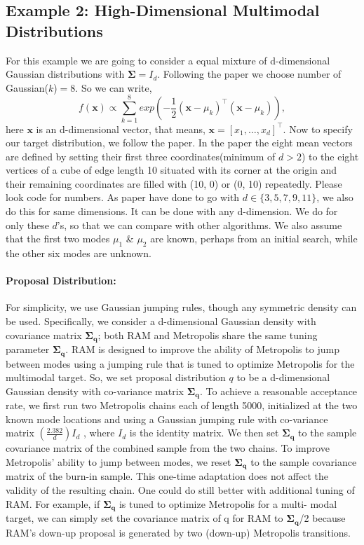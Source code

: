 \documentclass{article}
\begin{document}
\subsection{Example 2: High-Dimensional Multimodal
Distributions
}
For this example we are going to consider a equal mixture of  d-dimensional Gaussian distributions with $\mathbf{\Sigma}=I_d$. Following the paper we choose number of Gaussian($k$)$=8$. So we can write,
\begin{equation*}
    f(\mathbf{x}) \propto \sum_{k=1}^8 exp\left(-\frac{1}{2}(\mathbf{x}-\mu_k)^\top(\mathbf{x}-\mu_k)\right),
\end{equation*}
here $\mathbf{x}$ is an d-dimensional vector, that means, $\mathbf{x}=[x_1,\ldots,x_d]^\top$. Now to specify our target distribution, we follow the paper. In the paper the eight mean vectors are
defined by setting their first three coordinates(minimum of $d>2$) to the eight vertices of a cube of edge length 10 situated with its corner at the
origin and their remaining coordinates are filled with (10, 0) or
(0, 10) repeatedly. Please look code for numbers.
As paper have done to go with $d \in \{3,5,7,9,11\}$, we also do this for same dimensions. It can be done with any d-dimension. We do for only these $d$'s, so that we can compare with other algorithms. We also assume that the first two modes $\mu_1$ \& $\mu_2$ are known, perhaps
from an initial search, while the other six modes are unknown.
\paragraph{Proposal Distribution:}For simplicity, we use Gaussian jumping rules, though any
symmetric density can be used. Specifically, we consider a
d-dimensional Gaussian density with covariance matrix $\mathbf{\Sigma_q}$; both RAM and Metropolis share the same tuning parameter $\mathbf{\Sigma_q}$. RAM is designed to improve the ability of
Metropolis to jump between modes using a jumping rule that is
tuned to optimize Metropolis for the multimodal target. So, we set proposal distribution $q$ to be a d-dimensional Gaussian density with co-variance matrix $\mathbf{\Sigma_q}$. To achieve a reasonable acceptance rate, we first
run two Metropolis chains each of length 5000, initialized at the
two known mode locations and using a Gaussian jumping rule
with co-variance matrix $(\frac{2.382}{d})I_d$ , where $I_d$ is the identity
matrix. We then set $\mathbf{\Sigma_q}$ to the sample covariance matrix of the
combined sample from the two chains. To improve Metropolis’ ability to jump between modes, we reset $\mathbf{\Sigma_q}$ to the sample
covariance matrix of the burn-in sample. This one-time adaptation does not affect the validity of the resulting chain.  One could do still better with additional tuning of RAM.
For example, if $\mathbf{\Sigma_q}$ is tuned to optimize Metropolis for a multi-
modal target, we can simply set the covariance matrix of q for
RAM to $\mathbf{\Sigma_q}$/2 because RAM’s down-up proposal is generated by
two (down-up) Metropolis transitions. 
\end{document}
